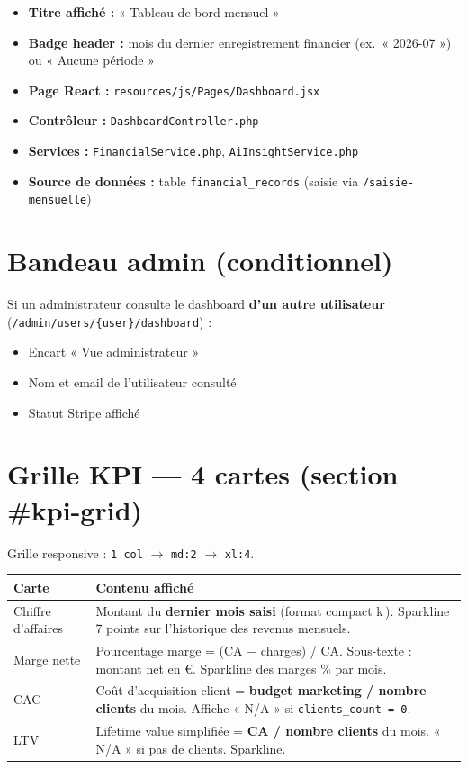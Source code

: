 \documentclass[11pt,a4paper]{report}
\newcommand{\filepath}[1]{\texttt{\small #1}}
\newcommand{\route}[1]{\texttt{\small #1}}
\begin{document}
\begin{itemize}[leftmargin=1.5em]
    \item \textbf{Titre affiché :} « Tableau de bord mensuel »
    \item \textbf{Badge header :} mois du dernier enregistrement financier (ex.\ « 2026-07 ») ou « Aucune période »
    \item \textbf{Page React :} \filepath{resources/js/Pages/Dashboard.jsx}
    \item \textbf{Contrôleur :} \filepath{DashboardController.php}
    \item \textbf{Services :} \filepath{FinancialService.php}, \filepath{AiInsightService.php}
    \item \textbf{Source de données :} table \texttt{financial\_records} (saisie via \route{/saisie-mensuelle})
\end{itemize}

\section{Bandeau admin (conditionnel)}

Si un administrateur consulte le dashboard \textbf{d'un autre utilisateur} (\route{/admin/users/\{user\}/dashboard}) :

\begin{itemize}[leftmargin=1.5em]
    \item Encart « Vue administrateur »
    \item Nom et email de l'utilisateur consulté
    \item Statut Stripe affiché
\end{itemize}

\section{Grille KPI — 4 cartes (section \#kpi-grid)}

Grille responsive : \texttt{1 col} $\rightarrow$ \texttt{md:2} $\rightarrow$ \texttt{xl:4}.

\begin{longtable}{@{}p{3.5cm}p{10.8cm}@{}}
\toprule
\textbf{Carte} & \textbf{Contenu affiché} \\
\midrule
\endhead
Chiffre d'affaires &
Montant du \textbf{dernier mois saisi} (format compact k\,\€). Sparkline 7 points sur l'historique des revenus mensuels. \\
Marge nette &
Pourcentage marge = (CA $-$ charges) / CA. Sous-texte : montant net en €. Sparkline des marges \% par mois. \\
CAC &
Coût d'acquisition client = \textbf{budget marketing / nombre clients} du mois. Affiche « N/A » si \texttt{clients\_count = 0}. \\
LTV &
Lifetime value simplifiée = \textbf{CA / nombre clients} du mois. « N/A » si pas de clients. Sparkline. \\
\bottomrule
\end{longtable}
\end{document}
